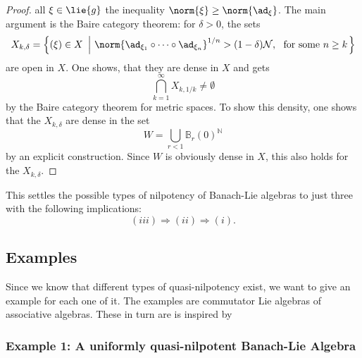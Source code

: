\documentclass[
11pt,                          %
english                        %
]{article}
\begin{document}
\begin{proof}
	all $\xi \in \lie{g}$ the inequality $\norm{\xi} \geq \norm{\ad_{\xi}}$. 
	The main argument is the Baire category theorem: for $\delta > 0$, the sets
	\begin{equation*}
		X_{k, \delta}
		=
		\left\{
			(\xi) \in X
		\ \left| \
			\norm{ \ad_{\xi_1} \circ \cdots \circ \ad_{\xi_n} }^{1/n}
			>
			(1 - \delta) \mathcal{N}
			, \
			\text{ for some }
			n \geq k	
		\right.
		\right\}
	\end{equation*}
	are open in $X$. One shows, that they are dense in $X$ and gets
	\begin{equation*}
		\bigcap\limits_{k = 1}^\infty
		X_{k, 1/k}
		\neq
		\emptyset
	\end{equation*}
	by the Baire category theorem for metric spaces. To show this density,
	one shows that the $X_{k, \delta}$ are dense in the set
	\begin{equation*}
		W 
		=
		\bigcup\limits_{r < 1}
		\mathbb{B}_r(0)^{\mathbb{N}}
	\end{equation*}
	by an explicit construction. Since $W$ is obviously dense in $X$, this also 
	holds for the $X_{k, \delta}$.
\end{proof}
This settles the possible types of nilpotency of Banach-Lie algebras to just three 
with the following implications:
\begin{equation}
	\label{nilpotencytypes}
	(iii) \Longrightarrow (ii) \Longrightarrow (i).
\end{equation}



\subsection{Examples}

Since we know that different types of quasi-nilpotency exist, we want to give an 
example for each one of it. The examples are commutator Lie algebras of associative 
algebras. These in turn are is inspired by \cite[Theorem 1]{dixon.mueller:1992a}


\subsubsection{Example 1: A uniformly quasi-nilpotent Banach-Lie Algebra}
\end{document}
